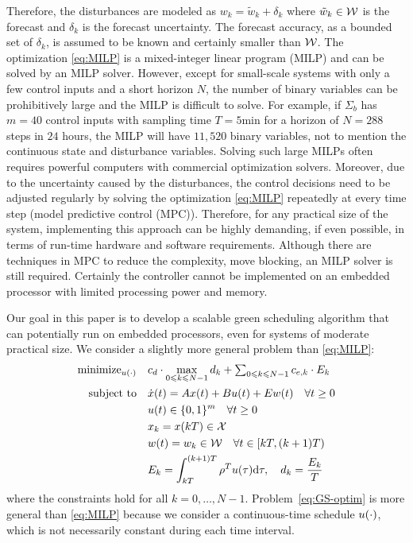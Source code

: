 Therefore, the disturbances are modeled as $w_{k} = \tilde{w}_{k} + \delta_{k}$ where $\tilde{w}_{k} \in \mathcal{W}$ is the forecast and $\delta_{k}$ is the forecast uncertainty.
The forecast accuracy, as a bounded set of $\delta_{k}$, is assumed to be known and certainly smaller than $\mathcal{W}$.
The optimization \eqref{eq:MILP} is a mixed-integer linear program (MILP) and can be solved by an MILP solver.
However, except for small-scale systems with only a few control inputs and a short horizon $N$, the number of binary variables can be prohibitively large and the MILP is difficult to solve.
For example, if $\Sigma_b$ has $m=40$ control inputs with sampling time $T = 5 \text{min}$ for a horizon of $N = 288$ steps in $24$ hours, the MILP will have $11 \comma 520$ binary variables, not to mention the continuous state and disturbance variables.
Solving such large MILPs often requires powerful computers with commercial optimization
solvers.
Moreover, due to the uncertainty caused by the disturbances, the control decisions need to be adjusted regularly by solving the optimization \eqref{eq:MILP} repeatedly at every time step (model predictive control (MPC)).
Therefore, for any practical size of the system, implementing this approach can be highly demanding, if even possible, in terms of run-time hardware and software requirements.
Although there are techniques in MPC to reduce the complexity, \eg move blocking, an MILP solver is still required.
Certainly the controller cannot be implemented on an embedded processor with limited processing power and memory.


Our goal in this paper is to develop a scalable green scheduling algorithm that can potentially run on embedded processors, even for systems of moderate practical size.
We consider a slightly more general problem than \eqref{eq:MILP}:
\begin{align}
  \operatorname{minimize}_{u (\cdot)} \quad & c_d \cdot \max_{0 \leqslant k \leqslant
  N - 1} d_k + \textstyle\sum_{0 \leqslant k \leqslant N - 1} c_{e, k} \cdot E_k 
  \label{eq:GS-optim}\\
  \text{subject to} \quad
  & \dot{x} (t) = Ax (t) + Bu (t) + Ew (t) \quad \forall t \geq 0 \nonumber\\
  & u(t) \in \{0,1\}^{m} \quad \forall t \geq 0 \nonumber\\
  & x_{k} = x (kT) \in \mathcal{X} \nonumber\\
  & w (t) = w_{k} \in \mathcal{W} \quad \forall t \in [kT, (k + 1) T) \nonumber\\
  & E_k = \int_{kT}^{(k + 1) T} \rho^{T} u(\tau) \mathrm{d} \tau, \quad d_k = \frac{E_k}{T} \nonumber
\end{align}
where the constraints hold for all $k = 0, \ldots, N - 1$.
Problem~\eqref{eq:GS-optim} is more general than \eqref{eq:MILP} because we consider a
continuous-time schedule $u (\cdot)$, which is not necessarily constant
during each time interval.




